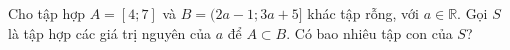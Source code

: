\begin{ex}
Cho tập hợp $A=[4;7]$ và $B=(2a-1;3a+5]$ khác tập rỗng, với $a\in\mathbb R$. Gọi $S$ là tập hợp các giá trị nguyên của $a$ để $A\subset B$. Có bao nhiêu tập con của $S$?
\end{ex}

